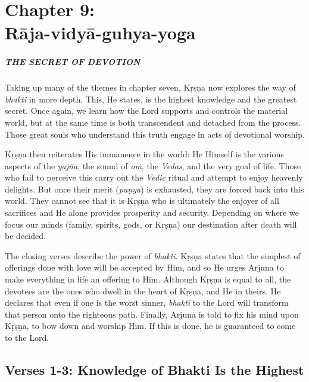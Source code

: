 \chapter{Chapter 9: \\Rāja-vidyā-guhya-yoga}\label{chap-raja-vidya-guhya-yoga}

\paragraph*{\MakeUppercase{The Secret of Devotion}}



\noindent Taking up many of the themes in chapter seven, Kṛṣṇa now explores the way of \textit{bhakti} in more depth. This, He states, is the highest knowledge and the greatest secret. Once again, we learn how the Lord supports and controls the material world, but at the same time is both transcendent and detached from the process. Those great souls who understand this truth engage in acts of devotional worship.

Kṛṣṇa then reiterates His immanence in the world: He Himself is the various aspects of the \textit{yajña}, the sound of \textit{oṁ}, the \textit{Vedas}, and the very goal of life. Those who fail to perceive this carry out the \textit{Vedic} ritual and attempt to enjoy heavenly delights. But once their merit (\textit{puṇya}) is exhausted, they are forced back into this world. They cannot see that it is Kṛṣṇa who is ultimately the enjoyer of all sacrifices and He alone provides prosperity and security. Depending on where we focus our minds (family, spirits, gods, or Kṛṣṇa) our destination after death will be decided.

The closing verses describe the power of \textit{bhakti}. Kṛṣṇa states that the simplest of offerings done with love will be accepted by Him, and so He urges Arjuna to make everything in life an offering to Him. Although Kṛṣṇa is equal to all, the devotees are the ones who dwell in the heart of Kṛṣṇa, and He in theirs. He declares that even if one is the worst sinner, \textit{bhakti} to the Lord will transform that person onto the righteous path. Finally, Arjuna is told to fix his mind upon Kṛṣṇa, to bow down and worship Him. If this is done, he is guaranteed to come to the Lord.

\section{Verses 1-3: Knowledge of Bhakti Is the Highest}\label{sec-verses-1-3-knowledge-of-bhakti-is-the-highest}

